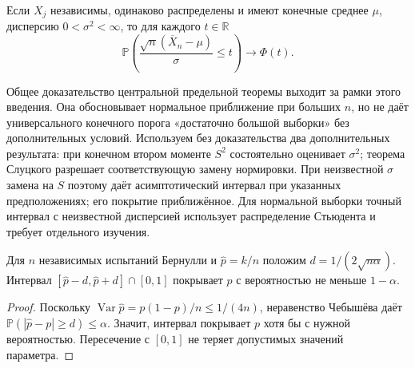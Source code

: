 \begin{theorem}
Если \(X_j\) независимы, одинаково распределены и имеют конечные среднее \(\mu\), дисперсию \(0<\sigma^2<\infty\), то для каждого \(t\in\mathbb R\)
\[
\mathbb P\!\left(\frac{\sqrt n(\overline X_n-\mu)}\sigma\le t\right)\longrightarrow\Phi(t).
\]
\end{theorem}
Общее доказательство центральной предельной теоремы выходит за рамки этого введения. Она обосновывает нормальное приближение при больших \(n\), но не даёт универсального конечного порога «достаточно большой выборки» без дополнительных условий. Используем без доказательства два дополнительных результата: при конечном втором моменте \(S^2\) состоятельно оценивает \(\sigma^2\); теорема Слуцкого разрешает соответствующую замену нормировки. При неизвестной \(\sigma\) замена на \(S\) поэтому даёт асимптотический интервал при указанных предположениях; его покрытие приближённое. Для нормальной выборки точный интервал с неизвестной дисперсией использует распределение Стьюдента и требует отдельного изучения.
\begin{theorem}
Для \(n\) независимых испытаний Бернулли и \(\widehat p=k/n\) положим \(d=1/(2\sqrt{n\alpha})\). Интервал \([\widehat p-d,\widehat p+d]\cap[0,1]\) покрывает \(p\) с вероятностью не меньше \(1-\alpha\).
\end{theorem}
\begin{proof}Поскольку \(\operatorname{Var}\widehat p=p(1-p)/n\le1/(4n)\), неравенство Чебышёва даёт \(\mathbb P(|\widehat p-p|\ge d)\le\alpha\). Значит, интервал покрывает \(p\) хотя бы с нужной вероятностью. Пересечение с \([0,1]\) не теряет допустимых значений параметра.\end{proof}
